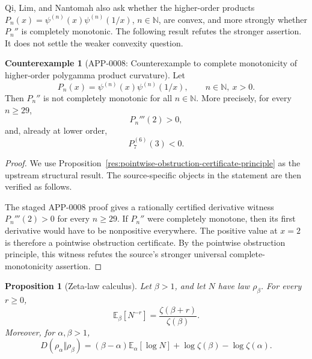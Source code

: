 \documentclass[11pt]{article}
\numberwithin{equation}{section}
\newtheorem{proposition}[theorem]{Proposition}
\theoremstyle{definition}
\newtheorem{counterexample}[theorem]{Counterexample}
\theoremstyle{remark}
\newcommand{\E}{\mathbb E}
\newcommand{\N}{\mathbb N}
\newcommand{\1}{\mathbf 1}
\begin{document}
Qi, Lim, and Nantomah also ask whether the higher-order products \(P_n(x)=\psi^{(n)}(x)\psi^{(n)}(1/x)\), \(n\in\N\), are convex, and more strongly whether \(P_n''\) is completely monotonic.  The following result refutes the stronger assertion.  It does not settle the weaker convexity question.

\begin{counterexample}[APP-0008: Counterexample to complete monotonicity of higher-order polygamma product curvature]
\label{thm:pn-complete-monotonicity-counterexample}
Let
\begin{equation}
\label{eq:pn-product}
P_n(x)=\psi^{(n)}(x)\psi^{(n)}(1/x),\qquad n\in\N,\ x>0.
\end{equation}
Then \(P_n''\) is not completely monotonic for all \(n\in\N\).  More precisely, for every \(n\ge29\),
\begin{equation}
\label{eq:pn-high-order-third-positive}
P_n'''(2)>0,
\end{equation}
and, already at lower order,
\begin{equation}
\label{eq:p7-sixth-negative}
P_7^{(6)}(3)<0.
\end{equation}


\end{counterexample}

\begin{proof}
We use Proposition~\ref{res:pointwise-obstruction-certificate-principle} as the upstream structural result. The source-specific objects in the statement are then verified as follows.

The staged APP-0008 proof gives a rationally certified derivative witness \(P_n'''(2)>0\) for every \(n\ge29\). If \(P_n''\) were completely monotone, then its first derivative would have to be nonpositive everywhere. The positive value at \(x=2\) is therefore a pointwise obstruction certificate. By the pointwise obstruction principle, this witness refutes the source's stronger universal complete-monotonicity assertion.
\end{proof}

\begin{proposition}[Zeta-law calculus]
\label{prop:zeta-law-calculus}
Let \(\beta>1\), and let \(N\) have law \(\rho_\beta\).  For every \(r\ge0\),
\begin{equation}
\label{eq:zeta-law-moment}
\E_\beta[N^{-r}]=\frac{\zeta(\beta+r)}{\zeta(\beta)}.
\end{equation}
Moreover, for \(\alpha,\beta>1\),
\begin{equation}
\label{eq:zeta-law-relative-entropy}
D(\rho_\alpha\Vert\rho_\beta)
=(\beta-\alpha)\E_\alpha[\log N]
+\log\zeta(\beta)-\log\zeta(\alpha).
\end{equation}
\end{proposition}
\end{document}
